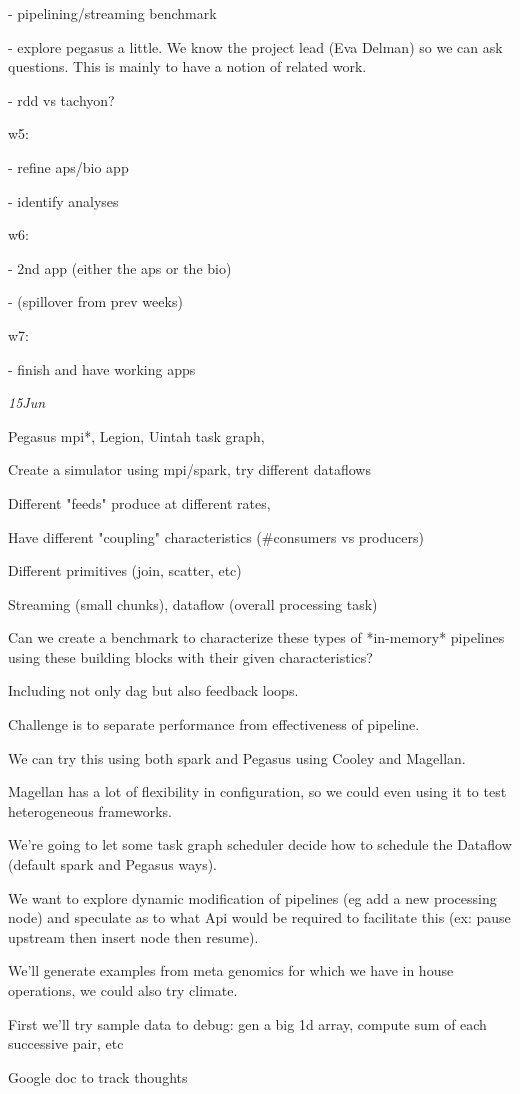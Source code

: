 - pipelining/streaming benchmark

- explore pegasus a little. We know the project lead (Eva Delman) so we
can ask questions. This is mainly to have a notion of related work.

- rdd vs tachyon?

w5:

- refine aps/bio app

- identify analyses

w6:

- 2nd app (either the aps or the bio)

- (spillover from prev weeks)

w7:

- finish and have working apps

\emph{15Jun}

Pegasus mpi*, Legion, Uintah task graph,

Create a simulator using mpi/spark, try different dataflows

Different "feeds" produce at different rates,

Have different "coupling" characteristics (\#consumers vs producers)

Different primitives (join, scatter, etc)

Streaming (small chunks), dataflow (overall processing task)

Can we create a benchmark to characterize these types of *in-memory*
pipelines using these building blocks with their given characteristics?

Including not only dag but also feedback loops.

Challenge is to separate performance from effectiveness of pipeline.

We can try this using both spark and Pegasus using Cooley and Magellan.

Magellan has a lot of flexibility in configuration, so we could even
using it to test heterogeneous frameworks.

We're going to let some task graph scheduler decide how to schedule the
Dataflow (default spark and Pegasus ways).

We want to explore dynamic modification of pipelines (eg add a new
processing node) and speculate as to what Api would be required to
facilitate this (ex: pause upstream then insert node then resume).

We'll generate examples from meta genomics for which we have in house
operations, we could also try climate.

First we'll try sample data to debug: gen a big 1d array, compute sum of
each successive pair, etc

Google doc to track thoughts